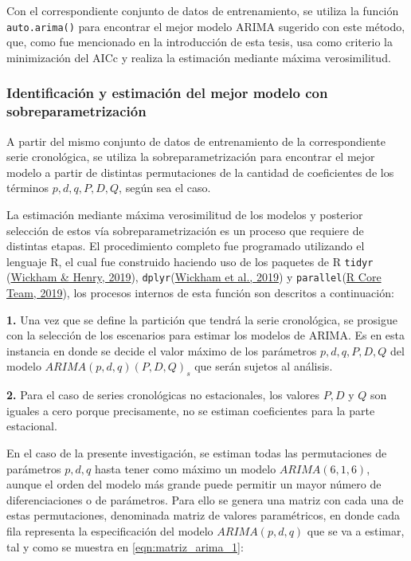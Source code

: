 \documentclass[
]{article}
\begin{document}
Con el correspondiente conjunto de datos de entrenamiento, se utiliza la
función \texttt{auto.arima()} para encontrar el mejor modelo ARIMA
sugerido con este método, que, como fue mencionado en la introducción de
esta tesis, usa como criterio la minimización del AICc y realiza la
estimación mediante máxima verosimilitud.

\subsubsection{Identificación y estimación del mejor modelo con sobreparametrización}

A partir del mismo conjunto de datos de entrenamiento de la
correspondiente serie cronológica, se utiliza la sobreparametrización
para encontrar el mejor modelo a partir de distintas permutaciones de la
cantidad de coeficientes de los términos \(p, d, q, P, D, Q\), según sea
el caso.

La estimación mediante máxima verosimilitud de los modelos y posterior
selección de estos vía sobreparametrización es un proceso que requiere
de distintas etapas. El procedimiento completo fue programado utilizando
el lenguaje R, el cual fue construido haciendo uso de los paquetes de R
\texttt{tidyr} (\protect\hyperlink{ref-tidyr}{Wickham \& Henry, 2019}),
\texttt{dplyr}(\protect\hyperlink{ref-dplyr}{Wickham et al., 2019}) y
\texttt{parallel}(\protect\hyperlink{ref-parallel}{R Core Team, 2019}),
los procesos internos de esta función son descritos a continuación:

\textbf{1.} Una vez que se define la partición que tendrá la serie
cronológica, se prosigue con la selección de los escenarios para estimar
los modelos de ARIMA. Es en esta instancia en donde se decide el valor
máximo de los parámetros \(p,d,q,P,D,Q\) del modelo
\(ARIMA(p,d,q)(P,D,Q)_s\) que serán sujetos al análisis.

\textbf{2.} Para el caso de series cronológicas no estacionales, los
valores \(P,D\) y \(Q\) son iguales a cero porque precisamente, no se
estiman coeficientes para la parte estacional.

En el caso de la presente investigación, se estiman todas las
permutaciones de parámetros \(p,d,q\) hasta tener como máximo un modelo
\(ARIMA(6,1,6)\), aunque el orden del modelo más grande puede permitir
un mayor número de diferenciaciones o de parámetros. Para ello se genera
una matriz con cada una de estas permutaciones, denominada matriz de
valores paramétricos, en donde cada fila representa la especificación
del modelo \(ARIMA(p,d,q)\) que se va a estimar, tal y como se muestra
en \eqref{eqn:matriz_arima_1}:
\end{document}
